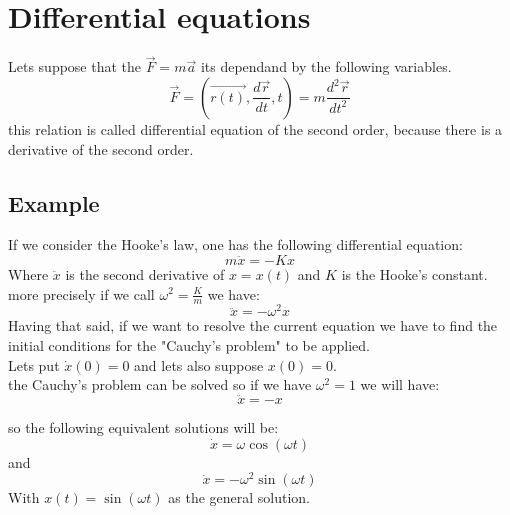 \documentclass{article}
\begin{document}
            \section{Differential equations}
                Lets suppose that the $\vec{F} = m \vec{a}$ its dependand by the following variables. 
                \begin{equation*}
                    \vec{F} = (\vec{r(t)}, \frac{d\vec{r}}{dt}, t) = m \frac{d^2 \vec{r}}{d t^2}
                \end{equation*}
                this relation is called differential equation of the second order, because there is a derivative of the second order.
                \subsection*{Example}
                    If we consider the Hooke's law, one has the following differential equation:
                    \begin{equation*}
                        m\ddot{x} = - K x 
                    \end{equation*}
                    Where $\ddot{x}$ is the second derivative of $x = x(t)$ and $K$ is the Hooke's constant.
                    more precisely if we call $\omega^2 = \frac{K}{m}$ we have:
                    \begin{equation*}
                        \ddot{x} = -\omega^2 x
                    \end{equation*}
                    Having that said, if we want to resolve the current equation we have to find the initial conditions for the "Cauchy's problem" to be applied. \\
                    Lets put $\dot{x}(0) = 0$ and lets also suppose $x(0) = 0$. \\
                    the Cauchy's problem can be solved so if we have $\omega^2 = 1$ we will have:
                    \begin{equation*}
                        \ddot{x} = -x 
                    \end{equation*}

                    so the following equivalent solutions will be:
                    \begin{equation*}
                        \dot{x} = \omega \cos(\omega t)
                    \end{equation*}
                    and 
                    \begin{equation*}
                        \dot{x} = -\omega^2 \sin(\omega t)
                    \end{equation*}
                    With $x(t) = \sin(\omega t)$ as the general solution.
\end{document}
